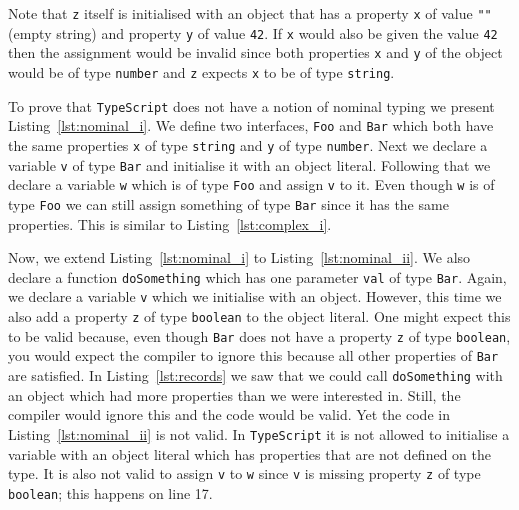 \documentclass{article}
\newcommand{\ttt}[1]{\texttt{#1}}
\begin{document}
Note that \ttt{z} itself is initialised with an object that has a property \ttt{x} of value \ttt{""} (empty string) and property \ttt{y} of value \ttt{42}.
If \ttt{x} would also be given the value \ttt{42} then the assignment would be invalid since both properties \ttt{x} and \ttt{y} of the object would be of type \ttt{number} and \ttt{z} expects \ttt{x} to be of type \ttt{string}.

\begin{center}
    \begin{minipage}{.75\textwidth}
    
    \end{minipage}
\end{center}
To prove that \ttt{TypeScript} does not have a notion of nominal typing we present Listing~\ref{lst:nominal_i}.
We define two interfaces, \ttt{Foo} and \ttt{Bar} which both have the same properties \ttt{x} of type \ttt{string} and \ttt{y} of type \ttt{number}.
Next we declare a variable \ttt{v} of type \ttt{Bar} and initialise it with an object literal.
Following that we declare a variable \ttt{w} which is of type \ttt{Foo} and assign \ttt{v} to it.
Even though \ttt{w} is of type \ttt{Foo} we can still assign something of type \ttt{Bar} since it has the same properties.
This is similar to Listing~\ref{lst:complex_i}.

\begin{center}
    \begin{minipage}{.75\textwidth}
    
    \end{minipage}
\end{center}

Now, we extend Listing~\ref{lst:nominal_i} to Listing~\ref{lst:nominal_ii}.
We also declare a function \ttt{doSomething} which has one parameter \ttt{val} of type \ttt{Bar}.
Again, we declare a variable \ttt{v} which we initialise with an object.
However, this time we also add a property \ttt{z} of type \ttt{boolean} to the object literal.
One might expect this to be valid because, even though \ttt{Bar} does not have a property \ttt{z} of type \ttt{boolean}, you would expect the compiler to ignore this because all other properties of \ttt{Bar} are satisfied.
In Listing~\ref{lst:records} we saw that we could call \ttt{doSomething} with an object which had more properties than we were interested in.
Still, the compiler would ignore this and the code would be valid.
Yet the code in Listing~\ref{lst:nominal_ii} is not valid.
In \ttt{TypeScript} it is not allowed to initialise a variable with an object literal which has properties that are not defined on the type.
It is also not valid to assign \ttt{v} to \ttt{w} since \ttt{v} is missing property \ttt{z} of type \ttt{boolean}; this happens on line 17. 
\end{document}
